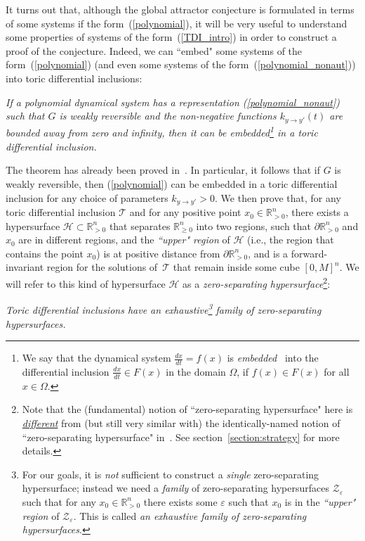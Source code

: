 \documentclass[12pt,letterpaper]{article}
\newcommand{\T}{\mathcal{T}}
\renewcommand{\H}{\mathcal{H}}
\newcommand{\Z}{\mathcal{Z}}
\newcommand{\RR}{\mathbb{R}}
\newcommand{\RRp}{\mathbb{R}_{>0}}
\newcommand{\eps}{\varepsilon}
\begin{document}
It turns out that, although the global attractor conjecture is formulated in terms of some systems if the form~(\ref{polynomial}), it will be very useful to understand some properties of systems of the form~(\ref{TDI_intro}) in order to construct a proof of the conjecture. Indeed, we can ``embed" some systems of the form~(\ref{polynomial}) (and even some systems of the form~(\ref{polynomial_nonaut})) into toric differential inclusions:

\bigskip

 \emph{If a polynomial dynamical system has a representation (\ref{polynomial_nonaut}) such that $G$ is weakly reversible and the non-negative functions $k_{y \to y'}(t)$ are bounded away from zero and infinity, then it can be embedded\footnote{
We say that the dynamical system $\frac{dx}{dt} = f(x)$ is {\em embedded} \ into the differential inclusion $\frac{dx}{dt} \in F(x)$ in the domain $\Omega$, if $f(x)\in F(x)$ for all $x\in\Omega$. 
} in a toric differential inclusion.}


\bigskip

\noindent The theorem has already been proved in~\cite{Craciun_SIAGA_2019}. In particular, it follows that if $G$ is weakly reversible, then (\ref{polynomial}) can be embedded in a toric differential inclusion for any choice of parameters $k_{y \to y'}\!>\!0$. 
We then prove that, for any toric differential inclusion $\T$ and for any positive point $x_0 \in \RRp^n$, there exists a hypersurface $\H \subset \RRp^n$ that separates $\RR^n_{\ge 0}$ into two regions, such that $\partial \RRp^n$ and $x_0$ are in different regions, and the {\em ``upper" region} of $\H$ (i.e., the region that contains the point $x_0$) is at positive distance from $\partial \RRp^n$, and is a forward-invariant region for the solutions of~$\T$ that remain inside some cube $[0,M]^n$. We will refer to this kind of hypersurface $\H$ as a {\em zero-separating hypersurface}\footnote{Note that the (fundamental) notion of ``zero-separating hypersurface" here is \ul{\em different} from (but still very similar with) the identically-named notion of ``zero-separating hypersurface" in~\cite{GAC_Proof_version_2}. See section~\ref{section:strategy} for more details.}:

\bigskip

 \emph{Toric differential inclusions have an exhaustive\footnote{For our goals, it is {\em not} sufficient to construct a {\em single} zero-separating hypersurface; instead we need a {\em family} of zero-separating hypersurfaces $\Z_\eps$ such that for any $x_0 \in \RRp^n$ there exists some $\eps$ such that $x_0$ is in the {\em ``upper" region} of $\Z_\eps$. This is called {\em an exhaustive family of zero-separating hypersurfaces}.} family of zero-separating hypersurfaces.}
\end{document}
